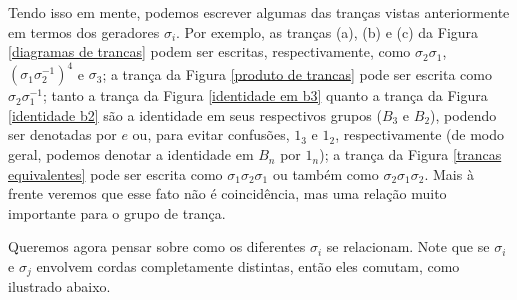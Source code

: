 \documentclass[a4paper,portuguese,11pt,twoside, leqno]{book}
\theoremstyle{definition}
\newtheorem{exercise}{Exercício}[section]
\newtheorem*{solution}{Solução}
\begin{document}
	\par\vspace{0.3cm} Tendo isso em mente, podemos escrever algumas das tranças vistas anteriormente em termos dos geradores $\sigma_i$. Por exemplo, as tranças (a), (b) e (c) da Figura \eqref{diagramas de trancas} podem ser escritas, respectivamente, como $\sigma_2\sigma_1$, $(\sigma_1\sigma_2^{-1})^4$ e $\sigma_3$; a trança da Figura \eqref{produto de trancas} pode ser escrita como $\sigma_2\sigma_1^{-1}$; tanto a trança da Figura \eqref{identidade em b3} quanto a trança da Figura \eqref{identidade b2} são a identidade em seus respectivos grupos ($B_3$ e $B_2$), podendo ser denotadas por $e$ ou, para evitar confusões, $1_3$ e $1_2$, respectivamente (de modo geral, podemos denotar a identidade em $B_n$ por $1_n$); a trança da Figura \eqref{trancas equivalentes} pode ser escrita como $\sigma_1\sigma_2\sigma_1$ ou também como $\sigma_2\sigma_1\sigma_2$. Mais à frente veremos que esse fato não é coincidência, mas uma relação muito importante para o grupo de trança.
	
	
	
	\par\vspace{0.3cm} Queremos agora pensar sobre como os diferentes $\sigma_i$ se relacionam. Note que se $\sigma_i$ e $\sigma_j$ envolvem cordas completamente distintas, então eles comutam, como ilustrado abaixo.
	
\end{document}
